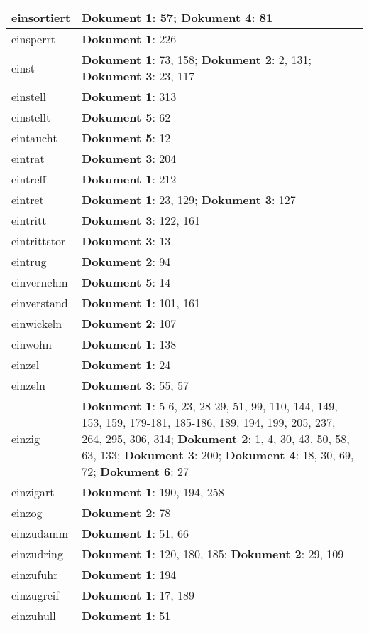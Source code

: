 \documentclass[a5paper]{article}
\begin{document}
\begin{longtable}[l]{|l|p{3in}|}
\hline
einsortiert & \textbf{Dokument 1}: 57; \textbf{Dokument 4}: 81 \\
\hline
einsperrt & \textbf{Dokument 1}: 226 \\
\hline
einst & \textbf{Dokument 1}: 73, 158; \textbf{Dokument 2}: 2, 131; \textbf{Dokument 3}: 23, 117 \\
\hline
einstell & \textbf{Dokument 1}: 313 \\
\hline
einstellt & \textbf{Dokument 5}: 62 \\
\hline
eintaucht & \textbf{Dokument 5}: 12 \\
\hline
eintrat & \textbf{Dokument 3}: 204 \\
\hline
eintreff & \textbf{Dokument 1}: 212 \\
\hline
eintret & \textbf{Dokument 1}: 23, 129; \textbf{Dokument 3}: 127 \\
\hline
eintritt & \textbf{Dokument 3}: 122, 161 \\
\hline
eintrittstor & \textbf{Dokument 3}: 13 \\
\hline
eintrug & \textbf{Dokument 2}: 94 \\
\hline
einvernehm & \textbf{Dokument 5}: 14 \\
\hline
einverstand & \textbf{Dokument 1}: 101, 161 \\
\hline
einwickeln & \textbf{Dokument 2}: 107 \\
\hline
einwohn & \textbf{Dokument 1}: 138 \\
\hline
einzel & \textbf{Dokument 1}: 24 \\
\hline
einzeln & \textbf{Dokument 3}: 55, 57 \\
\hline
einzig & \textbf{Dokument 1}: 5-6, 23, 28-29, 51, 99, 110, 144, 149, 153, 159, 179-181, 185-186, 189, 194, 199, 205, 237, 264, 295, 306, 314; \textbf{Dokument 2}: 1, 4, 30, 43, 50, 58, 63, 133; \textbf{Dokument 3}: 200; \textbf{Dokument 4}: 18, 30, 69, 72; \textbf{Dokument 6}: 27 \\
\hline
einzigart & \textbf{Dokument 1}: 190, 194, 258 \\
\hline
einzog & \textbf{Dokument 2}: 78 \\
\hline
einzudamm & \textbf{Dokument 1}: 51, 66 \\
\hline
einzudring & \textbf{Dokument 1}: 120, 180, 185; \textbf{Dokument 2}: 29, 109 \\
\hline
einzufuhr & \textbf{Dokument 1}: 194 \\
\hline
einzugreif & \textbf{Dokument 1}: 17, 189 \\
\hline
einzuhull & \textbf{Dokument 1}: 51 \\

\end{longtable}
\end{document}
